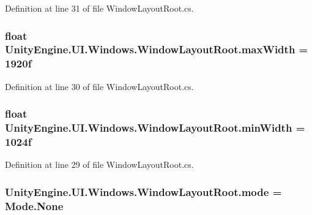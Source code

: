 Definition at line 31 of file Window\+Layout\+Root.\+cs.

\hypertarget{class_unity_engine_1_1_u_i_1_1_windows_1_1_window_layout_root_a653e847a6866be7fbe2e446bc720b6a2}{}
\subsubsection[{max\+Width}]{\setlength{\rightskip}{0pt plus 5cm}float Unity\+Engine.\+U\+I.\+Windows.\+Window\+Layout\+Root.\+max\+Width = 1920f}\label{class_unity_engine_1_1_u_i_1_1_windows_1_1_window_layout_root_a653e847a6866be7fbe2e446bc720b6a2}


Definition at line 30 of file Window\+Layout\+Root.\+cs.

\hypertarget{class_unity_engine_1_1_u_i_1_1_windows_1_1_window_layout_root_a55622a2438c58fca7bace840bcea3378}{}
\subsubsection[{min\+Width}]{\setlength{\rightskip}{0pt plus 5cm}float Unity\+Engine.\+U\+I.\+Windows.\+Window\+Layout\+Root.\+min\+Width = 1024f}\label{class_unity_engine_1_1_u_i_1_1_windows_1_1_window_layout_root_a55622a2438c58fca7bace840bcea3378}


Definition at line 29 of file Window\+Layout\+Root.\+cs.

\hypertarget{class_unity_engine_1_1_u_i_1_1_windows_1_1_window_layout_root_a41166775d92d8c71a332da3c859019d6}{}
\subsubsection[{mode}]{ Unity\+Engine.\+U\+I.\+Windows.\+Window\+Layout\+Root.\+mode = Mode.\+None}\label{class_unity_engine_1_1_u_i_1_1_windows_1_1_window_layout_root_a41166775d92d8c71a332da3c859019d6}


